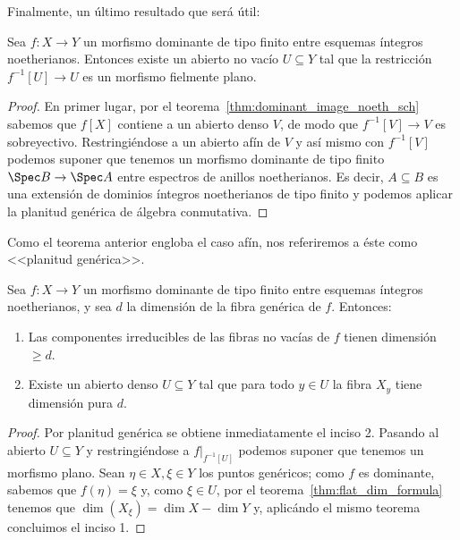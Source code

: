 Finalmente, un último resultado que será útil:
\begin{thm}
	Sea $f \colon X \to Y$ un morfismo dominante de tipo finito entre esquemas íntegros noetherianos.
	Entonces existe un abierto no vacío $U \subseteq Y$ tal que la restricción $f^{-1}[U] \to U$ es un morfismo fielmente plano.
\end{thm}
\begin{proof}
	En primer lugar, por el teorema~\ref{thm:dominant_image_noeth_sch} sabemos que $f[X]$ contiene a un abierto denso $V$,
	de modo que $f^{-1}[V] \to V$ es sobreyectivo.
	Restringiéndose a un abierto afín de $V$ y así mismo con $f^{-1}[V]$ podemos suponer que tenemos un morfismo dominante de tipo finito $\Spec B \to \Spec A$
	entre espectros de anillos noetherianos.
	Es decir, $A \subseteq B$ es una extensión de dominios íntegros noetherianos de tipo finito y podemos aplicar la planitud genérica de álgebra conmutativa.
\end{proof}
Como el teorema anterior engloba el caso afín, nos referiremos a éste como <<planitud genérica>>.
\begin{cor}\label{thm:dim_ineq_dominant_ft}
	Sea $f \colon X \to Y$ un morfismo dominante de tipo finito entre esquemas íntegros noetherianos, y sea $d$ la dimensión de la fibra genérica de $f$.
	Entonces:
	\begin{enumerate}
		\item Las componentes irreducibles de las fibras no vacías de $f$ tienen dimensión $\ge d$.
		\item Existe un abierto denso $U \subseteq Y$ tal que para todo $y \in U$ la fibra $X_y$ tiene dimensión pura $d$.
	\end{enumerate}
\end{cor}
\begin{proof}
	Por planitud genérica se obtiene inmediatamente el inciso 2.
	Pasando al abierto $U \subseteq Y$ y restringiéndose a $f|_{f^{-1}[U]}$ podemos suponer que tenemos un morfismo plano.
	Sean $\eta \in X, \xi \in Y$ los puntos genéricos; como $f$ es dominante, sabemos que $f(\eta) = \xi$ y, como $\xi \in U$,
	por el teorema~\ref{thm:flat_dim_formula} tenemos que $\dim(X_\xi) = \dim X - \dim Y$ y, aplicándo el mismo teorema concluimos el inciso 1.
\end{proof}

